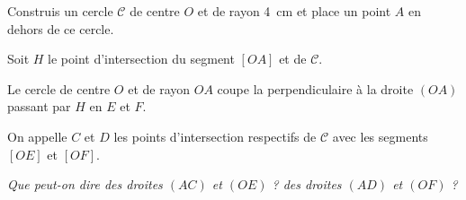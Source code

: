 Construis un cercle $\mathscr{C}$ de centre $O$ et de rayon 4~cm et
place un point $A$ en dehors de ce cercle.
\par Soit $H$ le point d'intersection du segment $[OA]$ et de
$\mathscr{C}$.
\par Le cercle de centre $O$ et de rayon $OA$ coupe la perpendiculaire
à la droite $(OA)$ passant par $H$ en $E$ et $F$.
\par On appelle $C$ et $D$ les points d'intersection respectifs de
$\mathscr{C}$ avec les segments $[OE]$ et $[OF]$.
\par{\em Que peut-on dire des droites $(AC)$ et $(OE)$ ? des droites
  $(AD)$ et $(OF)$ ?}
